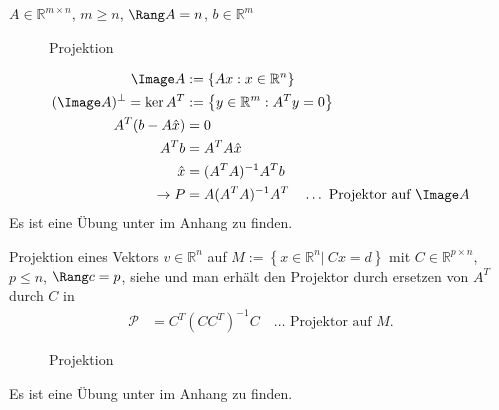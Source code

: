 \begin{enumerate}[label=(\arabic*)]
  		$A\in\mathbb{R}^{m\times n}$, $m\ge n$, $\Rang A=n$, $b\in\mathbb{R}^m$\\
  		\begin{figure}[!htb]
			\centering
			
			\caption{Projektion}
			\label{fig:kap_1_projektion}
		\end{figure}
  		\begin{align}
  			\Image A & := \left\{Ax:x\in\mathbb{R}^n \right\} \notag\\
  			(\Image A)^{\bot} =\ker A^T & := \left\{y\in\mathbb{R}^m:A^Ty=0 \right\}\notag\\
  			A^T(b-A\hat{x}) & = 0\notag\\
  			A^Tb & = A^TA\hat{x}\notag\\
  			\hat{x} & = (A^TA)^{-1}A^Tb\notag\\ 
  			\rightarrow P & = A(A^TA)^{-1}A^T\quad \ldots\text{ Projektor auf $\Image A$} \label{eq:kap_1_projektion}
  		\end{align}
  		Es ist eine Übung unter  im Anhang zu finden.
  		
  		Projektion eines Vektors $v\in\mathbb{R}^n$ auf $M:=\left\{x\in\mathbb{R}^n|\ Cx=d \right\}$ mit $C\in\mathbb{R}^{p\times n}$, $p\le n$, $\Rang c = p$, siehe
  		 und man erhält den Projektor durch ersetzen von $A^T$ durch $C$ in 
  		\begin{align*}
  			\mathcal{P} & = C^T(CC^T)^{-1}C\quad \ldots\text{ Projektor auf $M$}. 
  		\end{align*}
  		\begin{figure}[!htb]
			\centering
			
			\caption{Projektion}
			\label{fig:kap_1_projektion}
		\end{figure}
  		Es ist eine Übung unter  im Anhang zu finden.
\end{enumerate}

